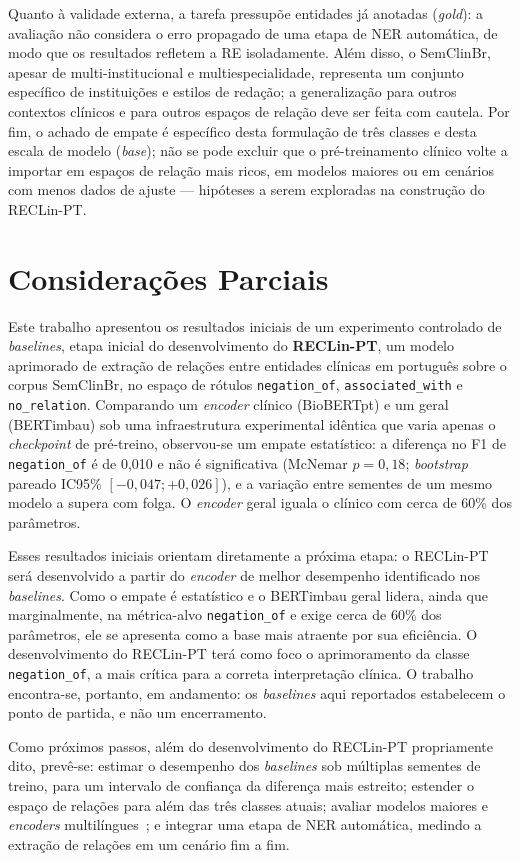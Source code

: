 \documentclass[12pt]{article}
\begin{document}
Quanto à validade externa, a tarefa pressupõe entidades já anotadas
(\emph{gold}): a avaliação não considera o erro propagado de uma etapa de NER
automática, de modo que os resultados refletem a RE isoladamente. Além disso, o
SemClinBr, apesar de multi-institucional e multiespecialidade, representa um
conjunto específico de instituições e estilos de redação; a generalização para
outros contextos clínicos e para outros espaços de relação deve ser feita com
cautela. Por fim, o achado de empate é específico desta formulação de três
classes e desta escala de modelo (\emph{base}); não se pode excluir que o
pré-treinamento clínico volte a importar em espaços de relação mais ricos, em
modelos maiores ou em cenários com menos dados de ajuste --- hipóteses a serem
exploradas na construção do RECLin-PT.

\section{Considerações Parciais}\label{sec:conc}

Este trabalho apresentou os resultados iniciais de um experimento controlado de
\emph{baselines}, etapa inicial do desenvolvimento do \textbf{RECLin-PT}, um
modelo aprimorado de extração de relações entre entidades clínicas em português
sobre o corpus SemClinBr, no espaço de rótulos \texttt{negation\_of},
\texttt{associated\_with} e \texttt{no\_relation}. Comparando um \emph{encoder}
clínico (BioBERTpt) e um geral (BERTimbau) sob uma infraestrutura experimental
idêntica que varia apenas o \emph{checkpoint} de pré-treino, observou-se um
empate estatístico: a diferença no F1 de \texttt{negation\_of} é de 0,010 e não é
significativa (McNemar $p=0,18$; \emph{bootstrap} pareado IC95\%
$[-0,047;+0,026]$), e a variação entre sementes de um mesmo modelo a supera com
folga. O \emph{encoder} geral iguala o clínico com cerca de 60\% dos parâmetros.

Esses resultados iniciais orientam diretamente a próxima etapa: o RECLin-PT será
desenvolvido a partir do \emph{encoder} de melhor desempenho identificado nos
\emph{baselines}. Como o empate é estatístico e o BERTimbau geral lidera, ainda
que marginalmente, na métrica-alvo \texttt{negation\_of} e exige cerca de 60\%
dos parâmetros, ele se apresenta como a base mais atraente por sua eficiência. O
desenvolvimento do RECLin-PT terá como foco o aprimoramento da classe
\texttt{negation\_of}, a mais crítica para a correta interpretação clínica. O
trabalho encontra-se, portanto, em andamento: os \emph{baselines} aqui reportados
estabelecem o ponto de partida, e não um encerramento.

Como próximos passos, além do desenvolvimento do RECLin-PT propriamente dito,
prevê-se: estimar o desempenho dos \emph{baselines} sob múltiplas sementes de
treino, para um intervalo de confiança da diferença mais estreito; estender o
espaço de relações para além das três classes atuais; avaliar modelos maiores e
\emph{encoders} multilíngues~\cite{conneau:20}; e integrar uma etapa de NER
automática, medindo a extração de relações em um cenário fim a fim.



\end{document}
